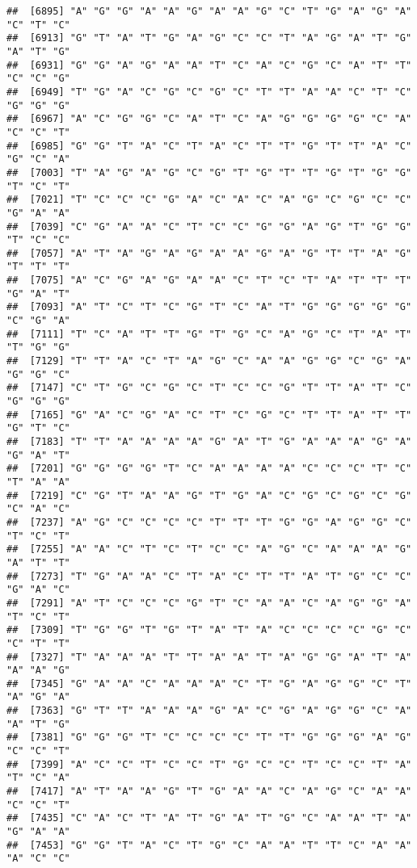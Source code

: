 \documentclass[
]{article}
\begin{document}
\begin{verbatim}
##  [6895] "A" "G" "G" "A" "A" "G" "A" "A" "G" "C" "T" "G" "A" "G" "A" "C" "T" "C"
##  [6913] "G" "T" "A" "T" "G" "A" "G" "C" "C" "T" "A" "G" "A" "T" "G" "A" "T" "G"
##  [6931] "G" "G" "A" "G" "A" "A" "T" "C" "A" "C" "G" "C" "A" "T" "T" "C" "C" "G"
##  [6949] "T" "G" "A" "C" "G" "C" "G" "C" "T" "T" "A" "A" "C" "T" "C" "G" "G" "G"
##  [6967] "A" "C" "G" "G" "C" "A" "T" "C" "A" "G" "G" "G" "G" "C" "A" "C" "C" "T"
##  [6985] "G" "G" "T" "A" "C" "T" "A" "C" "T" "T" "G" "T" "T" "A" "C" "G" "C" "A"
##  [7003] "T" "A" "G" "A" "G" "C" "G" "T" "G" "T" "T" "G" "T" "G" "G" "T" "C" "T"
##  [7021] "T" "C" "C" "C" "G" "A" "C" "A" "C" "A" "G" "C" "G" "C" "C" "G" "A" "A"
##  [7039] "C" "G" "A" "A" "C" "T" "C" "C" "G" "G" "A" "G" "T" "G" "G" "T" "C" "C"
##  [7057] "A" "T" "A" "G" "A" "G" "A" "A" "G" "A" "G" "T" "T" "A" "G" "T" "T" "T"
##  [7075] "A" "C" "G" "A" "G" "A" "A" "C" "T" "C" "T" "A" "T" "T" "T" "G" "A" "T"
##  [7093] "A" "T" "C" "T" "C" "G" "T" "C" "A" "T" "G" "G" "G" "G" "G" "C" "G" "A"
##  [7111] "T" "C" "A" "T" "T" "G" "T" "G" "C" "A" "G" "C" "T" "A" "T" "T" "G" "G"
##  [7129] "T" "T" "A" "C" "T" "A" "G" "C" "A" "A" "G" "G" "C" "G" "A" "G" "G" "C"
##  [7147] "C" "T" "G" "C" "G" "C" "T" "C" "C" "G" "T" "T" "A" "T" "C" "G" "G" "G"
##  [7165] "G" "A" "C" "G" "A" "C" "T" "C" "G" "C" "T" "T" "A" "T" "T" "G" "T" "C"
##  [7183] "T" "T" "A" "A" "A" "A" "G" "A" "T" "G" "A" "A" "A" "G" "A" "G" "A" "T"
##  [7201] "G" "G" "G" "G" "T" "C" "A" "A" "A" "A" "C" "C" "C" "T" "C" "T" "A" "A"
##  [7219] "C" "G" "T" "A" "A" "G" "T" "G" "A" "C" "G" "C" "G" "C" "G" "C" "A" "C"
##  [7237] "A" "G" "C" "C" "C" "C" "T" "T" "T" "G" "G" "A" "G" "G" "C" "T" "C" "T"
##  [7255] "A" "A" "C" "T" "C" "T" "C" "C" "A" "G" "C" "A" "A" "A" "G" "A" "T" "T"
##  [7273] "T" "G" "A" "A" "C" "T" "A" "C" "T" "T" "A" "T" "G" "C" "C" "G" "A" "C"
##  [7291] "A" "T" "C" "C" "C" "G" "T" "C" "A" "A" "C" "A" "G" "G" "A" "T" "C" "T"
##  [7309] "T" "G" "G" "T" "G" "T" "A" "T" "A" "C" "C" "C" "C" "G" "C" "C" "T" "T"
##  [7327] "T" "A" "A" "A" "T" "T" "A" "A" "T" "A" "G" "G" "A" "T" "A" "A" "A" "G"
##  [7345] "G" "A" "A" "C" "A" "A" "A" "C" "T" "G" "A" "G" "G" "C" "T" "A" "G" "A"
##  [7363] "G" "T" "T" "A" "A" "A" "G" "A" "C" "G" "A" "G" "G" "C" "A" "A" "T" "G"
##  [7381] "G" "G" "G" "T" "C" "C" "C" "C" "T" "T" "G" "G" "G" "A" "G" "C" "C" "T"
##  [7399] "A" "C" "C" "T" "C" "C" "T" "G" "C" "C" "T" "C" "C" "T" "A" "T" "C" "A"
##  [7417] "A" "T" "A" "A" "G" "T" "G" "A" "A" "C" "A" "G" "C" "A" "A" "C" "C" "T"
##  [7435] "C" "A" "C" "T" "A" "T" "G" "A" "T" "G" "C" "A" "A" "T" "A" "G" "A" "A"
##  [7453] "G" "G" "T" "A" "C" "T" "G" "C" "A" "A" "T" "T" "C" "A" "A" "A" "C" "C"

\end{verbatim}
\end{document}
